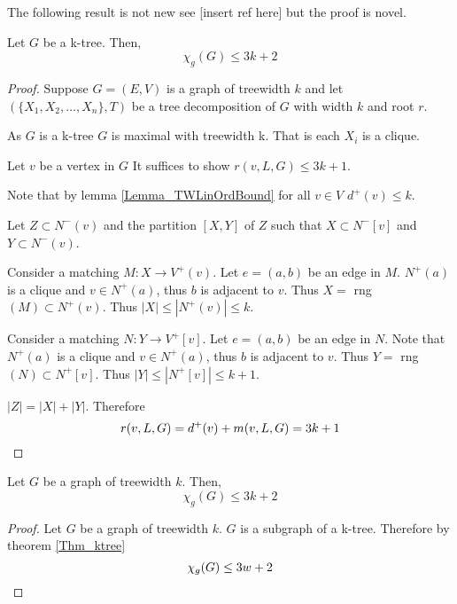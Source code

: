 
The following result is not new see [insert ref here] but the proof is novel.
\begin{theorem} \label{Thm_ktree}
        Let $G$ be a k-tree. Then, 
        \[\chi_g(G) \leq 3k + 2\]
\end{theorem}

\begin{proof}
    Suppose $G=(E,V)$ is a graph of treewidth $k$ and let $(\{X_1,X_2,\dots,X_n\},T)$ be a tree decomposition of $G$ with width $k$ and root $r$.
    
    As $G$ is a k-tree $G$ is maximal with treewidth k. That is each $X_i$ is a clique.
    
    Let $v$ be a vertex in $G$ It suffices to show $r(v,L,G) \leq 3k + 1$.
    
    
    Note that by lemma \ref{Lemma_TWLinOrdBound} for all $v \in V$ $d^+(v) \leq k$.
    
    Let $Z \subset N^-(v)$ and the partition $[X,Y]$ of $Z$ such that $X\subset N^-[v]$ and  $Y\subset N^-(v)$.
           
    Consider a matching $M\colon X \to V^+(v)$. Let $e=(a,b)$ be an edge in $M$.
    $N^+(a)$ is a clique and $v\in N^+(a)$, thus $b$ is adjacent to $v$. Thus $X =$ rng$(M)\subset N^+(v)$. Thus $|X| \leq |N^+(v)| \leq k$. 
    
    Consider a matching $N\colon Y \to V^+[v]$. Let $e=(a,b)$ be an edge in $N$.
    Note that $N^+(a)$ is a clique and $v\in N^+(a)$, thus $b$ is adjacent to $v$. Thus $Y =$ rng$(N)\subset N^+[v]$. Thus $|Y| \leq |N^+[v]| \leq k+1$. 
        
    $|Z| = |X|+|Y|$. Therefore \[r(v,L,G) = d^+(v) + m(v,L,G) = 3k +1 \qedhere\]        
\end{proof}

\begin{corollary}
    Let $G$ be a graph of treewidth $k$. Then, 
    \[\chi_g(G) \leq 3k + 2\]
\end{corollary}

\begin{proof}
    Let $G$ be a graph of treewidth $k$.
    $G$ is a subgraph of a k-tree. Therefore by theorem \ref{Thm_ktree} \[\chi_g(G) \leq 3w + 2 \qedhere\] 
\end{proof}

